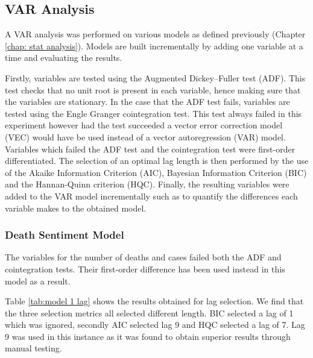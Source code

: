 \subsection{VAR Analysis}

A VAR analysis was performed on various models as defined previously (Chapter \ref{chap: stat analysis}). Models are built incrementally by adding one variable at a time and evaluating the results.

Firstly, variables are tested using the Augmented Dickey–Fuller test (ADF). This test checks that no unit root is present in each variable, hence making sure that the variables are stationary. In the case that the ADF test fails, variables are tested using the Engle Granger cointegration test. This test always failed in this experiment however had the test succeeded a vector error correction model (VEC) would have be used instead of a vector autoregression (VAR) model. Variables which failed the ADF test and the cointegration test were first-order differentiated. The selection of an optimal lag length is then performed by the use of the Akaike Information Criterion (AIC), Bayesian Information Criterion (BIC) and the Hannan-Quinn criterion (HQC). Finally, the resulting variables were added to the VAR model incrementally such as to quantify the differences each variable makes to the obtained model.

\subsubsection{Death Sentiment Model}

The variables for the number of deaths and cases failed both the ADF and cointegration tests. Their first-order difference has been used instead in this model as a result.

Table \ref{tab:model 1 lag} shows the results obtained for lag selection. We find that the three selection metrics all selected different length. BIC selected a lag of 1 which was ignored, secondly AIC selected lag 9 and HQC selected a lag of 7. Lag 9 was used in this instance as it was found to obtain superior results through manual testing.

